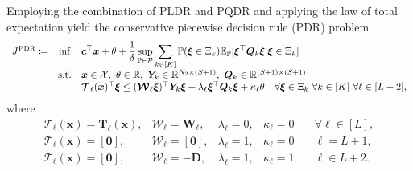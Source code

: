 \documentclass{article}
\newcommand{\st}{\textnormal{s.t.}}
\newcommand{\PP}{\mathbb{P}}
\newcommand{\EE}{\mathbb{E}}
\newcommand{\RR}{\mathbb{R}}
\newcommand{\X}{\mathcal{X}}
\begin{document}
Employing the combination of PLDR and PQDR and applying the law of total expectation yield the conservative piecewise decision rule (PDR) problem%
\begin{equation}
\label{eq:pdr}
\begin{array}{ccl}
J^{\textup{PDR}} \coloneqq & \displaystyle \inf & \displaystyle \bm c^\top \bm x + \theta + \frac{1}{\delta} \sup_{\PP\in\mathcal P} \sum_{k \in [K]}  \PP(\bm \xi \in \Xi_k)\EE_\PP[\bm \xi^\top \bm Q_k \bm\xi | \bm\xi\in\Xi_k]  \\
&\st & \bm x \in \X, \ \theta \in \RR, \ \bm Y_k \in \RR^{N_2 \times (S+1)},\ \bm Q_k \in \RR^{(S+1) \times (S+1)}\\
& & \bm{\mathcal{T}}_\ell (\bm x)^\top\bm \xi  \leq (\bm{\mathcal{W}}_\ell \bm\xi)^\top\bm Y_k\bm\xi + \lambda_\ell \bm \xi^\top \bm Q_k \bm \xi + \kappa_\ell \theta \quad \forall \bm\xi \in \Xi_k \ \forall k \in [K] \ \forall \ell \in [L+2],
\end{array}
\end{equation}
where 
\begin{equation*}
\left.\begin{matrix}
\bm{\mathcal{T}}_\ell (\bm x) = \bm T_\ell(\bm x), & \bm{\mathcal{W}}_\ell = \bm W_\ell, & \lambda_\ell = 0, & \kappa_\ell = 0 \quad & \forall \ell \in [L], \\ 
\bm{\mathcal{T}}_\ell (\bm x) = [\bm 0], & \bm{\mathcal{W}}_\ell = [\bm 0], & \lambda_\ell = 1, & \kappa_\ell = 0 \quad & \ell = L+1, \\ 
\bm{\mathcal{T}}_\ell (\bm x) = [\bm 0], & \bm{\mathcal{W}}_\ell = -\bm D, & \lambda_\ell = 1, & \kappa_\ell = 1 \quad & \ell \in L+2. \\ 
\end{matrix}\right.
\end{equation*}
 
\end{document}
